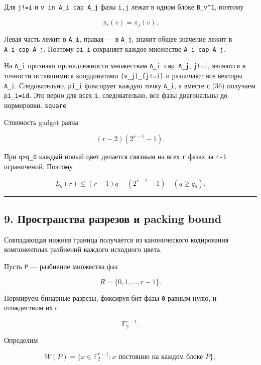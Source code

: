 Для \texttt{j!=i} и \texttt{v\ in\ A\_i\ cap\ A\_j} фазы \texttt{i,j}
лежат в одном блоке \texttt{B\_v\^{}1}, поэтому

\[
\pi_i(v)=\pi_j(v).
\tag{37}
\]

Левая часть лежит в \texttt{A\_i}, правая --- в \texttt{A\_j}, значит
общее значение лежит в \texttt{A\_i\ cap\ A\_j}. Поэтому \texttt{pi\_i}
сохраняет каждое множество \texttt{A\_i\ cap\ A\_j}.

На \texttt{A\_i} признаки принадлежности множествам
\texttt{A\_i\ cap\ A\_j}, \texttt{j!=i}, являются в точности оставшимися
координатами \texttt{(v\_j)\_\{j!=i\}} и различают все векторы
\texttt{A\_i}. Следовательно, \texttt{pi\_i} фиксирует каждую точку
\texttt{A\_i}, а вместе с (36) получаем \texttt{pi\_i=id}. Это верно для
всех \texttt{i}, следовательно, все фазы диагональны до нормировки.
\texttt{square}

Стоимость gadget равна

\[
(r-2)(2^{r-1}-1).
\tag{38}
\]

При \texttt{q\textgreater{}q\_0} каждый новый цвет делается связным на
всех \texttt{r} фазах за \texttt{r-1} ограничений. Поэтому

\[
L_q(r)\le(r-1)q-(2^{r-1}-1)
\quad(q\ge q_0).
\tag{39}
\]

\begin{center}\rule{0.5\linewidth}{0.5pt}\end{center}

\hypertarget{ux43fux440ux43eux441ux442ux440ux430ux43dux441ux442ux432ux430-ux440ux430ux437ux440ux435ux437ux43eux432-ux438-packing-bound}{%
\subsection{9. Пространства разрезов и packing
bound}\label{ux43fux440ux43eux441ux442ux440ux430ux43dux441ux442ux432ux430-ux440ux430ux437ux440ux435ux437ux43eux432-ux438-packing-bound}}

Совпадающая нижняя граница получается из канонического кодирования
компонентных разбиений каждого исходного цвета.

Пусть \texttt{P} --- разбиение множества фаз

\[
R=\{0,1,\ldots,r-1\}.
\]

Нормируем бинарные разрезы, фиксируя бит фазы \texttt{0} равным нулю, и
отождествим их с

\[
\mathbb F_2^{r-1}.
\]

Определим

\[
W(P)=\{x\in\mathbb F_2^{r-1}:x\text{ постоянно на каждом блоке }P\},
\tag{40}
\]

